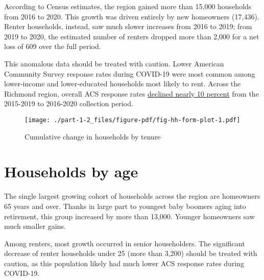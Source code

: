 \documentclass[
  letterpaper,
  DIV=11,
  numbers=noendperiod]{scrreprt}
\begin{document}
According to Census estimates, the region gained more than 15,000
households from 2016 to 2020. This growth was driven entirely by new
homeowners (17,436). Renter households, instead, saw much slower
increases from 2016 to 2019; from 2019 to 2020, the estimated number of
renters dropped more than 2,000 for a net loss of 609 over the full
period.

\begin{tcolorbox}[enhanced jigsaw, colback=white, colbacktitle=quarto-callout-warning-color!10!white, bottomrule=.15mm, opacitybacktitle=0.6, colframe=quarto-callout-warning-color-frame, breakable, opacityback=0, bottomtitle=1mm, titlerule=0mm, coltitle=black, leftrule=.75mm, left=2mm, title=\textcolor{quarto-callout-warning-color}{\faExclamationTriangle}\hspace{0.5em}{Warning}, toptitle=1mm, arc=.35mm, rightrule=.15mm, toprule=.15mm]
This anomalous data should be treated with caution. Lower American
Community Survey response rates during COVID-19 were most common among
lower-income and lower-educated households most likely to rent. Across
the Richmond region, overall ACS response rates
\href{https://www.prb.org/articles/capturing-covids-impact-on-the-american-community-survey-across-counties/}{declined
nearly 10 percent} from the 2015-2019 to 2016-2020 collection period.
\end{tcolorbox}

\begin{figure}

{\centering \texttt{[image: ./part-1-2\_files/figure-pdf/fig-hh-form-plot-1.pdf]}

}

\caption{\label{fig-hh-form-plot}Cumulative change in households by
tenure}

\end{figure}

\hypertarget{households-by-age}{%
\section{Households by age}\label{households-by-age}}

The single largest growing cohort of households across the region are
homeowners 65 years and over. Thanks in large part to youngest baby
boomers aging into retirement, this group increased by more than 13,000.
Younger homeowners saw much smaller gains.

Among renters, most growth occurred in senior householders. The
significant decrease of renter households under 25 (more than 3,200)
should be treated with caution, as this population likely had much lower
ACS response rates during COVID-19.
\end{document}
